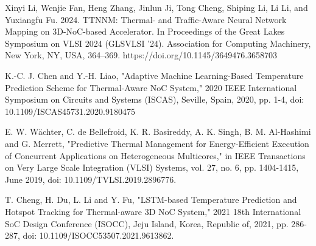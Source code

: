 \documentclass[conference]{IEEEtran}
\begin{document}
\begin{thebibliography}{00}
Xinyi Li, Wenjie Fan, Heng Zhang, Jinlun Ji, Tong Cheng, Shiping Li, Li Li, and Yuxiangfu Fu. 2024. TTNNM: Thermal- and Traffic-Aware Neural Network Mapping on 3D-NoC-based Accelerator. In Proceedings of the Great Lakes Symposium on VLSI 2024 (GLSVLSI '24). Association for Computing Machinery, New York, NY, USA, 364–369. https://doi.org/10.1145/3649476.3658703

K.-C. J. Chen and Y.-H. Liao, "Adaptive Machine Learning-Based Temperature Prediction Scheme for Thermal-Aware NoC System," 2020 IEEE International Symposium on Circuits and Systems (ISCAS), Seville, Spain, 2020, pp. 1-4, doi: 10.1109/ISCAS45731.2020.9180475

E. W. Wächter, C. de Bellefroid, K. R. Basireddy, A. K. Singh, B. M. Al-Hashimi and G. Merrett, "Predictive Thermal Management for Energy-Efficient Execution of Concurrent Applications on Heterogeneous Multicores," in IEEE Transactions on Very Large Scale Integration (VLSI) Systems, vol. 27, no. 6, pp. 1404-1415, June 2019, doi: 10.1109/TVLSI.2019.2896776.

T. Cheng, H. Du, L. Li and Y. Fu, "LSTM-based Temperature Prediction and Hotspot Tracking for Thermal-aware 3D NoC System," 2021 18th International SoC Design Conference (ISOCC), Jeju Island, Korea, Republic of, 2021, pp. 286-287, doi: 10.1109/ISOCC53507.2021.9613862.

\end{thebibliography}
\end{document}
